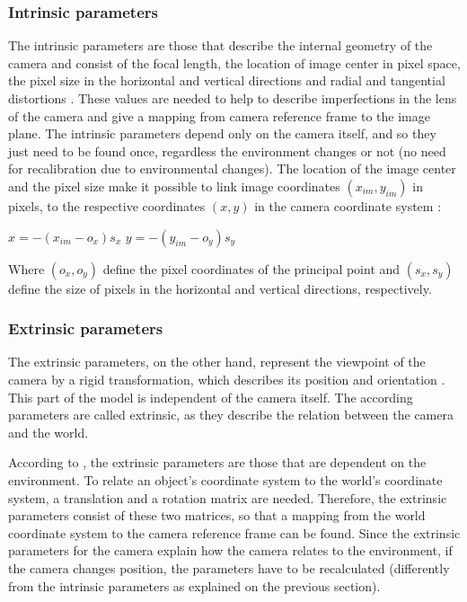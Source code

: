 \documentclass[msc, a4paper, classic, en]{ufbathesis}
\begin{document}
\subsubsection{Intrinsic parameters}

The intrinsic parameters are those that describe the internal geometry of the camera and consist of the focal length, the location of image center in pixel space, the pixel size in the horizontal and vertical directions and radial and tangential distortions \cite{malik2002}. These values are needed to help to describe imperfections in the lens of the camera and give a mapping from camera reference frame to the image plane. The intrinsic parameters depend only on the camera itself, and so they just need to be found once, regardless the environment changes or not (no need for recalibration due to environmental changes). The location of the image center and the pixel size make it possible to link image coordinates $(x_{im}, y_{im})$ in pixels, to the respective coordinates $(x, y)$ in the camera coordinate system \cite{malik2002}:

\begin{center}
$x = -(x_{im} - o_x)s_x$
$y = -(y_{im} - o_y)s_y$
\end{center}

Where $(o_x, o_y)$ define the pixel coordinates of the principal point and $(s_x, s_y)$ define the size of pixels in the horizontal and vertical directions, respectively.

\subsubsection{Extrinsic parameters}

The extrinsic parameters, on the other hand, represent the viewpoint of the camera by a rigid transformation, which describes its position and orientation \cite{bajramovic2010self}. This part of the model is independent of the camera itself. The according parameters are called extrinsic, as they describe the relation between the camera and the world.

According to \cite{tillapaugh2008indirect}, the extrinsic parameters are those that are dependent on the environment. To relate an object's coordinate system to the world's coordinate system, a translation and a rotation matrix are needed. Therefore, the extrinsic parameters consist of these two matrices, so that a mapping from the world coordinate system to the camera reference frame can be found. Since the extrinsic parameters for the camera explain how the camera relates to the environment, if the camera changes position, the parameters have to be recalculated (differently from the intrinsic parameters as explained on the previous section).
\end{document}
